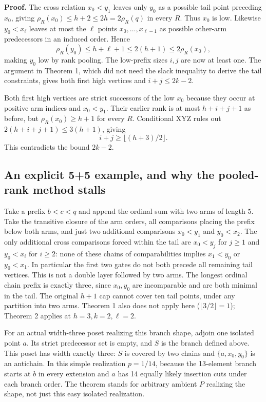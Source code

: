 \documentclass[10pt,letterpaper]{article}
\begin{document}
\textbf{Proof.} The cross relation \(x_0<y_1\) leaves only \(y_0\) as a
possible tail point preceding \(x_0\), giving
\(\rho_R(x_0)\le h+2\le2h=2\rho_R(q)\) in every \(R\). Thus \(x_0\) is
low. Likewise \(y_0<x_\ell\) leaves at most the \(\ell\) points
\(x_0,\ldots,x_{\ell-1}\) as possible other-arm predecessors in an
induced order. Hence \[
    \rho_R(y_0)\le h+\ell+1\le2(h+1)\le2\rho_R(x_0),
\] making \(y_0\) low by rank pooling. The low-prefix sizes \(i,j\) are
now at least one. The argument in Theorem 1, which did not need the
slack inequality to derive the tail constraints, gives both first high
vertices and \(i+j\le2k-2\).

Both first high vertices are strict successors of the low \(x_0\)
because they occur at positive arm indices and \(x_0<y_1\). Their
earlier rank is at most \(h+i+j+1\) as before, but
\(\rho_R(x_0)\ge h+1\) for every \(R\). Conditional XYZ rules out
\(2(h+i+j+1)\le3(h+1)\), giving \[
    i+j\ge\lfloor(h+3)/2\rfloor.
\] This contradicts the bound \(2k-2\).

\subsection{An explicit 5+5 example, and why the pooled-rank method
stalls}\label{an-explicit-55-example-and-why-the-pooled-rank-method-stalls}

Take a prefix \(b<c<q\) and append the ordinal sum with two arms of
length \(5\). Take the transitive closure of the arm orders, all
comparisons placing the prefix below both arms, and just two additional
comparisons \(x_0<y_1\) and \(y_0<x_2\). The only additional cross
comparisons forced within the tail are \(x_0<y_j\) for \(j\ge1\) and
\(y_0<x_i\) for \(i\ge2\): none of these chains of comparabilities
implies \(x_1<y_0\) or \(y_0<x_1\). In particular the first two gates do
not both precede all remaining tail vertices. This is not a double layer
followed by two arms. The longest ordinal chain prefix is exactly three,
since \(x_0,y_0\) are incomparable and are both minimal in the tail. The
original \(h+1\) cap cannot cover ten tail points, under any partition
into two arms. Theorem 1 also does not apply here
(\(\lfloor3/2\rfloor=1\)); Theorem 2 applies at \(h=3,k=2,\ell=2\).

For an actual width-three poset realizing this branch shape, adjoin one
isolated point \(a\). Its strict predecessor set is empty, and \(S\) is
the branch defined above. This poset has width exactly three: \(S\) is
covered by two chains and \(\{a,x_0,y_0\}\) is an antichain. In this
simple realization \(p=1/14\), because the 13-element branch starts at
\(b\) in every extension and \(a\) has 14 equally likely insertion cuts
under each branch order. The theorem stands for arbitrary ambient \(P\)
realizing the shape, not just this easy isolated realization.
\end{document}
